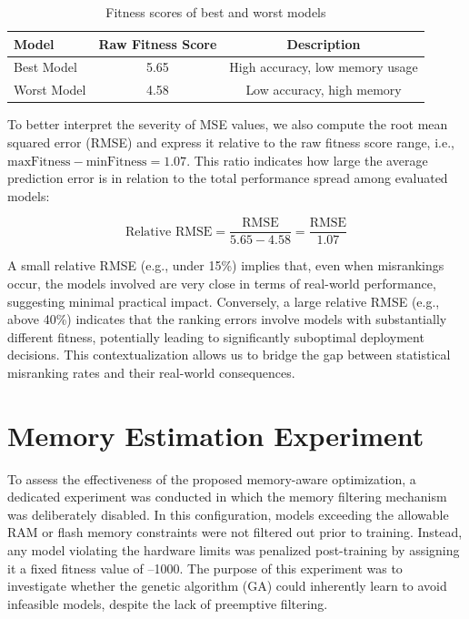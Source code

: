 \begin{table}[ht]
\centering
\caption{Fitness scores of best and worst models}
\begin{tabular}{lcc}
\toprule
Model & Raw Fitness Score & Description \\
\midrule
Best Model & 5.65 & High accuracy, low memory usage \\
Worst Model & 4.58 & Low accuracy, high memory \\
\bottomrule
\end{tabular}
\end{table}

To better interpret the severity of MSE values, we also compute the root mean squared error (RMSE) and express it relative to the raw fitness score range, i.e., \( \text{maxFitness} - \text{minFitness} = 1.07 \). This ratio indicates how large the average prediction error is in relation to the total performance spread among evaluated models:

\begin{equation}
\text{Relative RMSE} = \frac{\text{RMSE}}{5.65 - 4.58} = \frac{\text{RMSE}}{1.07}
\end{equation}

A small relative RMSE (e.g., under 15\%) implies that, even when misrankings occur, the models involved are very close in terms of real-world performance, suggesting minimal practical impact. Conversely, a large relative RMSE (e.g., above 40\%) indicates that the ranking errors involve models with substantially different fitness, potentially leading to significantly suboptimal deployment decisions. This contextualization allows us to bridge the gap between statistical misranking rates and their real-world consequences.




\section{Memory Estimation Experiment}
\label{sec:memory_estimation_experiment}
To assess the effectiveness of the proposed memory-aware optimization, a dedicated experiment was conducted in which the memory filtering mechanism was deliberately disabled. In this configuration, models exceeding the allowable RAM or flash memory constraints were not filtered out prior to training. Instead, any model violating the hardware limits was penalized post-training by assigning it a fixed fitness value of –1000. The purpose of this experiment was to investigate whether the genetic algorithm (GA) could inherently learn to avoid infeasible models, despite the lack of preemptive filtering.

